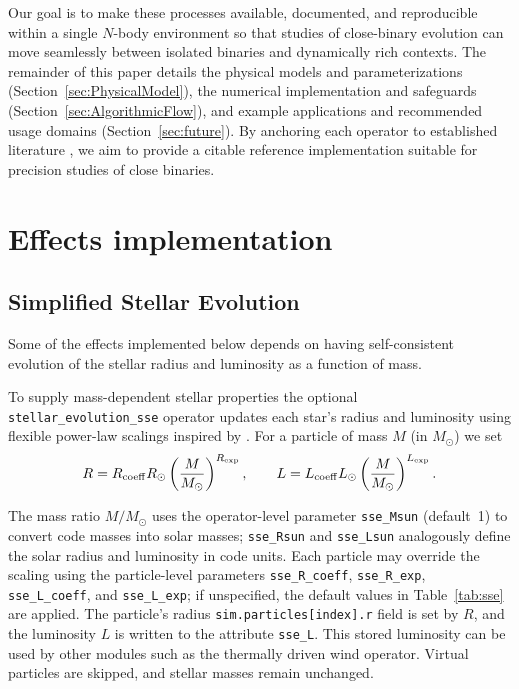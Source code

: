 \documentclass[11pt]{article}
\begin{document}
Our goal is to make these processes available, documented, and reproducible within a single $N$-body environment so that studies of close-binary evolution can move seamlessly between isolated binaries and dynamically rich contexts. The remainder of this paper details the physical models and parameterizations (Section~\ref{sec:PhysicalModel}), the numerical implementation and safeguards (Section~\ref{sec:AlgorithmicFlow}), and example applications and recommended usage domains (Section~\ref{sec:future}). By anchoring each operator to established literature \citep{Eggleton1983,Ritter1988,Reimers1975,Verbunt1981,Kawaler1988,Peters1964,Kidder1995,Hurley2000,Ostriker1999}, we aim to provide a citable reference implementation suitable for precision studies of close binaries.



\section{Effects implementation}


\subsection{Simplified Stellar Evolution}
\label{sec:sse}
Some of the effects implemented below depends on having self-consistent evolution of the stellar radius and luminosity as a function of mass.

To supply mass-dependent stellar properties the optional
\texttt{stellar\_evolution\_sse} operator updates each star's radius and
luminosity using flexible power-law scalings inspired by \citet{Hurley2000}. For a
particle of mass $M$ (in $M_\odot$) we set
\[
R = R_{\rm coeff} R_\odot \left(\frac{M}{M_\odot}\right)^{R_{\rm exp}},\qquad
L = L_{\rm coeff} L_\odot \left(\frac{M}{M_\odot}\right)^{L_{\rm exp}}.
\]

The mass ratio $M/M_\odot$ uses the operator-level parameter
\texttt{sse\_Msun} (default 1) to convert code masses into solar masses;
\texttt{sse\_Rsun} and \texttt{sse\_Lsun} analogously define the solar radius
and luminosity in code units.  Each particle may override the scaling using the
particle-level parameters \texttt{sse\_R\_coeff}, \texttt{sse\_R\_exp},
\texttt{sse\_L\_coeff}, and \texttt{sse\_L\_exp}; if unspecified, the default
values in Table~\ref{tab:sse} are applied.  The particle's radius \texttt{sim.particles[index].r} field is set by $R$, and the luminosity $L$ is written to the attribute
\texttt{sse\_L}. This stored luminosity can be used by other modules such as
the thermally driven wind operator. Virtual particles are skipped, and stellar
masses remain unchanged.
\end{document}
